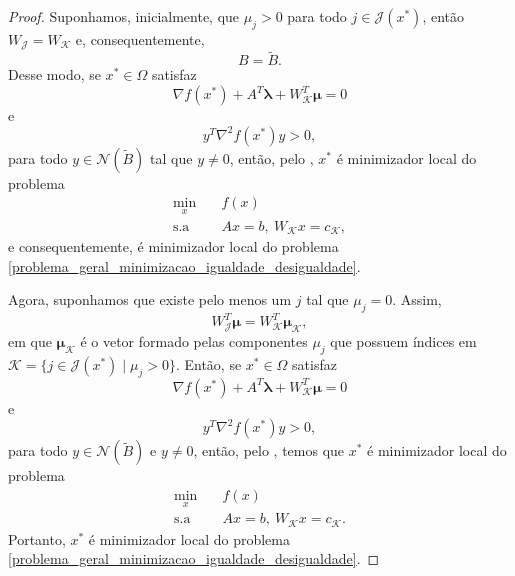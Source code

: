 \documentclass[12pt,a4paper]{scrartcl}
\def\RR{\mathds{R}}
\theoremstyle{definition}%
\newtheorem{defi}{Definição}
\begin{document}
\begin{proof}
Suponhamos, inicialmente, que $\mu_{j} >0$ para todo $j\in \mathcal{J}(x^{*})$, então $W_{\mathcal{J}} = W_{\mathcal{K}}$ e, consequentemente, 
\[
B = \tilde{B} .
\]
Desse modo, se $x^{*} \in \Omega$ satisfaz
\[
\nabla f(x^{*}) + A^{T}\boldsymbol{\lambda} + W^{T}_{\mathcal{K}} \boldsymbol{\mu} =0
\]
e
\[
y^{T}\nabla^{2} f(x^{*})y >0,
\]
para todo $y\in \mathcal{N}(\tilde{B})$ tal que $y\neq 0$, então, pelo , $x^{*}$ é minimizador local do problema
\[ 
\begin{aligned}
\min_{x} & \quad f(x) \\
\text{s.a} & \quad Ax=b, \ W_{\mathcal{K}}x=c_{\mathcal{K}} ,
\end{aligned}
\]
e consequentemente, é minimizador local do problema \eqref{problema_geral_minimizacao_igualdade_desigualdade}.

Agora, suponhamos que existe pelo menos um $j$ tal que $\mu_{j} =0$. Assim, 
\[
W_{\mathcal{J}}^{T}\boldsymbol{\mu} = W_{\mathcal{K}}^{T}\boldsymbol{\mu}_{\mathcal{K}} ,
\]
em que $\boldsymbol{\mu}_{\mathcal{K}}$ é o vetor formado pelas componentes $\mu_{j}$ que possuem índices em $\mathcal{K} = \{ j\in \mathcal{J}(x^{*}) \mid \mu_{j} >0 \}$. Então, se $x^{*} \in \Omega$ satisfaz
\[
\nabla f(x^{*}) + A^{T}\boldsymbol{\lambda} + W^{T}_{\mathcal{K}} \boldsymbol{\mu} =0
\]
e
\[
y^{T}\nabla^{2} f(x^{*})y >0,
\]
para todo $y\in \mathcal{N}(\tilde{B})$ e $y\neq 0$, então, pelo , temos que $x^{*}$ é minimizador local do problema
\[ 
\begin{aligned}
\min_{x} & \quad f(x) \\
\text{s.a} & \quad Ax=b, \ W_{\mathcal{K}}x=c_{\mathcal{K}} .
\end{aligned}
\]
Portanto, $x^{*}$ é minimizador local do problema \eqref{problema_geral_minimizacao_igualdade_desigualdade}.
\end{proof}



\end{document}
